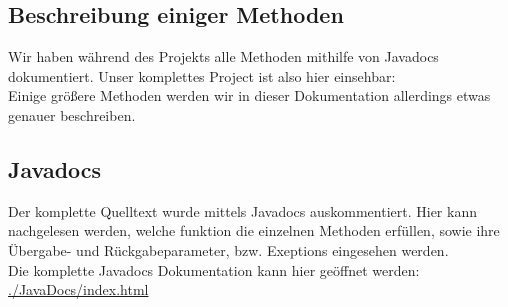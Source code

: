 \newpage


\subsection{Beschreibung einiger Methoden}




Wir haben während des Projekts alle Methoden mithilfe von Javadocs dokumentiert. Unser komplettes 
Project ist also hier einsehbar: %
\\

Einige größere Methoden werden wir in dieser Dokumentation allerdings etwas genauer beschreiben.

\subsection{Javadocs}
Der komplette Quelltext wurde mittels Javadocs auskommentiert. Hier kann nachgelesen werden, welche 
funktion die einzelnen Methoden erfüllen, sowie ihre Übergabe- und Rückgabeparameter, bzw. 
Exeptions  eingesehen werden.\\
Die komplette Javadocs Dokumentation kann hier geöffnet werden:\\
\url{./JavaDocs/index.html}